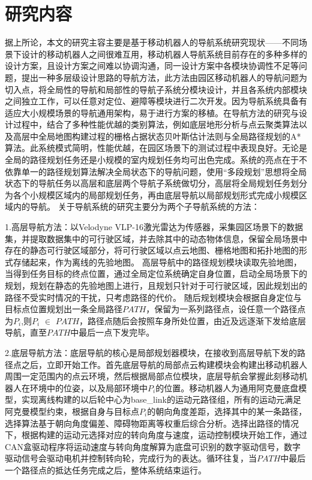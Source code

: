 \section{研究内容}
据上所论，本文的研究主容主要是基于移动机器人的导航系统研究现状——不同场景下设计的移动机器人之间很难互用，移动机器人导航系统目前存在的多种多样的设计方案，且设计方案之间难以协调沟通，同一设计方案中各模块协调性不足等问题，提出一种多层级设计思路的导航方法，此方法由园区移动机器人的导航问题为切入点，将全局性的导航和局部性的导航子系统分模块设计，并且各系统内部模块之间独立工作，可以任意对定位、避障等模块进行二次开发。因为导航系统具备有适应大小规模场景的导航通用架构，易于进行方案的移植。在导航方法的研究与设计过程中，结合了多种性能优越的类别算法，例如底层地形分析与点云聚类算法以及高层中全局地图构建过程的栅格占据状态贝叶斯估计法则与全局路径规划的A*算法。此系统模式简明，性能优越，在园区场景下的测试过程中表现良好。无论是全局的路径规划任务还是小规模的室内规划任务均可出色完成。系统的亮点在于不依靠单一的路径规划算法解决全局状态下的导航问题，使用“多段规划”思想将全局状态下的导航任务以高层和底层两个导航子系统做切分，高层将全局规划任务划分为各个小规模区域内的局部规划任务，再由底层导航以局部规划形式完成小规模区域内的导航。
关于导航系统的研究主要分为两个子导航系统的方法：

1.高层导航方法：以Velodyne VLP-16激光雷达为传感器，采集园区场景下的数据集，并提取数据集中的可行驶区域，并去除其中的动态物体信息，保留全局场景中存在的静态可行驶区域部分，将可行驶区域以点云地图、栅格地图和拓扑地图的形式存储起来，作为离线的先验地图。
高层导航中的路径规划模块读取先验地图，当得到任务目标的终点位置，通过全局定位系统确定自身位置，启动全局场景下的规划，规划在静态的先验地图上进行，且规划只针对于可行驶区域，因此规划出的路径不受实时情况的干扰，只考虑路径的代价。
随后规划模块会根据自身定位与目标点位置规划出一条全局路径$PATH$，保留为一系列路径点，设任意一个路径点为$P_i$,则$P_i$ $\in$ $PATH$，路径点随后会按照车身所处位置，由近及远逐渐下发给底层导航，直至$PATH$中最后一点下发完毕。

2.底层导航方法：底层导航的核心是局部规划器模块，在接收到高层导航下发的路径点之后，立即开始工作。首先底层导航的局部点云构建模块会构建出移动机器人周围一定范围内的点云环境，然后根据局部点位模块，底层导航会掌握此刻移动机器人在环境中的位姿，以及局部环境中$P_i$的位置。移动机器人为通用阿克曼底盘模型，实现离线构建的以后轮中心为base\_link的运动元路径组，所有的运动元满足阿克曼模型约束，根据自身与目标点$P_i$的朝向角度差距，选择其中的某一条路径，选择算法基于朝向角度偏差、障碍物距离等权重后综合分析。选择出路径的情况下，根据构建的运动元选择对应的转向角度与速度，运动控制模块开始工作，通过CAN盒驱动程序将运动速度与转向角度解算为底盘可识别的数字驱动信号，数字驱动信号会驱动电机并控制转向轮，完成行为的表达。循环往复，当$PATH$中最后一个路径点的抵达任务完成之后，整体系统结束运行。

